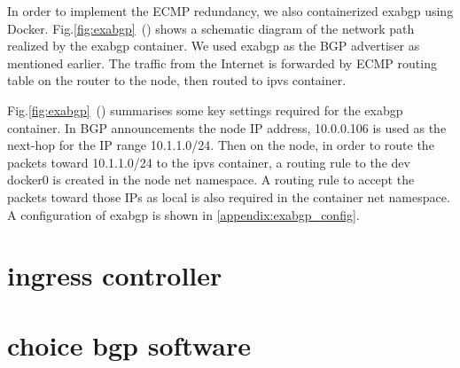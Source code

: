 In order to implement the ECMP redundancy, we also containerized exabgp using Docker.
Fig.\ref{fig:exabgp}~() shows a schematic diagram of the network path realized by the exabgp container.
We used exabgp as the BGP advertiser as mentioned earlier.
The traffic from the Internet is forwarded by ECMP routing table on the router to the node, then routed to ipvs container.

Fig.\ref{fig:exabgp}~() summarises some key settings required for the exabgp container.
In BGP announcements the node IP address, 10.0.0.106 is used as the next-hop for the IP range 10.1.1.0/24.
Then on the node, in order to route the packets toward 10.1.1.0/24 to the ipvs container, 
a routing rule to the dev docker0 is created in the node net namespace. 
A routing rule to accept the packets toward those IPs as local is also required in the container net namespace. 
A configuration of exabgp is shown in \ref{appendix:exabgp_config}.

\section{ingress controller}

\section{choice bgp software}

